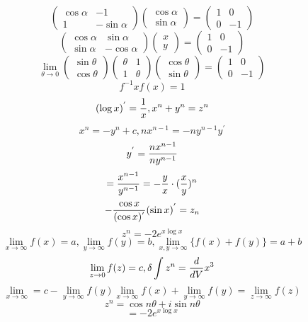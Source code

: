 \documentclass{jsarticle}
\begin{document}
{   $$ \begin{pmatrix} \cos \alpha & - 1 \\
	   1 & - \sin \alpha \end{pmatrix} \begin{pmatrix} \cos \alpha \\ 
		   \sin \alpha
   \end{pmatrix} = \begin{pmatrix} 1 & 0 \\
   0 & - 1 \end{pmatrix} $$
   $$ \begin{pmatrix} \cos \alpha & \sin \alpha \\
   \sin \alpha & - \cos \alpha \end{pmatrix} \begin{pmatrix}
   x \\ y \end{pmatrix} = \begin{pmatrix} 1 & 0 \\
   0 & - 1 \end{pmatrix} $$
   $$ \lim_{\theta \to 0} \begin{pmatrix} \sin \theta \\ \cos \theta 
   \end{pmatrix} \begin{pmatrix} \theta & 1 \\
   1 & \theta \end{pmatrix} \begin{pmatrix} \cos \theta \\ \sin \theta
	   \end{pmatrix} = \begin{pmatrix} 1 & 0 \\ 0 & - 1 \end{pmatrix} $$
		   $$ f^{-1}xf(x) = 1 $$
		   $$ (\log x)^{'} = {1 \over x}, x^n + y^n = z^n  $$
		   $$ x^n = - y^n + c, nx^{n-1} = -n y^{n-1}y^{'} $$
		   $$ y^{'} = {{n x^{n-1}} \over {n y^{n-1}}} $$
		   $$ = {x^{n-1} \over y^{n-1}}= - {y \over x}\cdot
		   ({x \over y})^n $$
		   $$ - {\cos x \over (\cos x)^{'}}(\sin x)^{'} = z_n $$
		   $$ z^n = - 2 e^{x \log x} $$
		   $$ \lim_{x \to \infty} f(x) = a, \lim_{y \to \infty}
		   f(y) = b, \lim_{x,y \to \infty}\{f(x) + f(y)\} = a + b  $$
		   $$ \lim_{z \to 0}f(z) = c, \delta \int z^n = {d \over dV}
		   x^3 $$
		   $$ \lim_{x \to \infty} = c - \lim_{y \to \infty}f(y)
		   \lim_{x \to \infty} f(x) + \lim_{y \to \infty}f(y) = 
		   \lim_{z \to \infty}f(z) $$
		   $$ z^n = \cos n \theta + i \sin n \theta $$
		   $$ = - 2 e^{x \log x} $$

}
\end{document}
